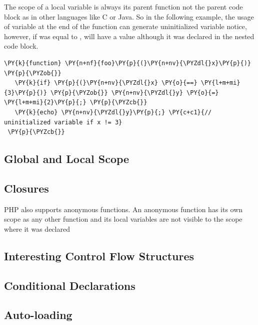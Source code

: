     The scope of a local variable is always its parent function not the 
    parent code block as in other languages like C or Java. So in the following 
    example, the usage of variable  at the end of the function 
    can generate uninitialized variable notice, however, if  
    was equal to ,  will have a value although it 
    was declared in the nested code block.

\begin{Verbatim}[commandchars=\\\{\}]
 \PY{k}{function} \PY{n+nf}{foo}\PY{p}{(}\PY{n+nv}{\PYZdl{}x}\PY{p}{)} \PY{p}{\PYZob{}}
   \PY{k}{if} \PY{p}{(}\PY{n+nv}{\PYZdl{}x} \PY{o}{==} \PY{l+m+mi}{3}\PY{p}{)} \PY{p}{\PYZob{}} \PY{n+nv}{\PYZdl{}y} \PY{o}{=} \PY{l+m+mi}{2}\PY{p}{;} \PY{p}{\PYZcb{}}
   \PY{k}{echo} \PY{n+nv}{\PYZdl{}y}\PY{p}{;} \PY{c+c1}{// uninitialized variable if x != 3}
 \PY{p}{\PYZcb{}}
\end{Verbatim}
    
    \subsection{Global and Local Scope}

    \subsection{Closures}
    PHP also supports anonymous functions. An anonymous function has its 
    own scope as any other function and its local variables are not visible 
    to the scope where it was declared

    \subsection{Interesting Control Flow Structures}
    
    \subsection{Conditional Declarations}
                
    \subsection{Auto-loading}
    
